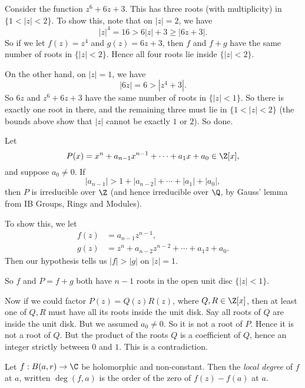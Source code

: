 \documentclass[a4paper]{article}
\begin{document}
\begin{eg}
  Consider the function $z^6 + 6z + 3$. This has three roots (with multiplicity) in $\{1 < |z| < 2\}$. To show this, note that on $|z| = 2$, we have
  \[
    |z|^4 = 16 > 6|z| + 3 \geq |6z + 3|.
  \]
  So if we let $f(z) = z^4$ and $g(z) = 6z + 3$, then $f$ and $f + g$ have the same number of roots in $\{|z| < 2\}$. Hence all four roots lie inside $\{|z| < 2\}$.

  On the other hand, on $|z| = 1$, we have
  \[
    |6z| = 6 > |z^4 + 3|.
  \]
  So $6z$ and $z^6 + 6z + 3$ have the same number of roots in $\{|z| < 1\}$. So there is exactly one root in there, and the remaining three must lie in $\{1 < |z| < 2\}$ (the bounds above show that $|z|$ cannot be exactly $1$ or $2$). So done.
\end{eg}

\begin{eg}
  Let
  \[
    P(x) = x^n + a_{n - 1} x^{n - 1} + \cdots + a_1 x + a_0 \in \Z[x],
  \]
  and suppose $a_0 \not= 0$. If
  \[
    |a_{n - 1}| > 1 + |a_{n - 2}| + \cdots + |a_1| + |a_0|,
  \]
  then $P$ is irreducible over $\Z$ (and hence irreducible over $\Q$, by Gauss' lemma from IB Groups, Rings and Modules).

  To show this, we let
  \begin{align*}
    f(z) &= a_{n - 1} z^{n - 1},\\
    g(z) &= z^n + a_{n - 2}z^{n - 2} + \cdots + a_1 z + a_0.
  \end{align*}
  Then our hypothesis tells us $|f| > |g|$ on $|z| = 1$.

  So $f$ and $P = f + g$ both have $n - 1$ roots in the open unit disc $\{|z| < 1\}$.

  Now if we could factor $P(z) = Q(z)R(z)$, where $Q, R \in \Z[x]$, then at least one of $Q, R$ must have all its roots inside the unit disk. Say all roots of $Q$ are inside the unit disk. But we assumed $a_0 \not= 0$. So it is not a root of $P$. Hence it is not a root of $Q$. But the product of the roots $Q$ is a coefficient of $Q$, hence an integer strictly between $0$ and $1$. This is a contradiction.
\end{eg}

\begin{defi}
  Let $f: B(a, r) \to \C$ be holomorphic and non-constant. Then the \emph{local degree} of $f$ at $a$, written $\deg(f, a)$ is the order of the zero of $f(z) - f(a)$ at $a$.
\end{defi}
\end{document}
